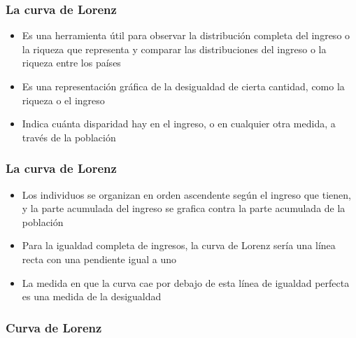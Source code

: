 \documentclass{beamer}
\begin{document}
\begin{frame} 
\frametitle{La curva de Lorenz}
\begin{itemize}
\item Es una herramienta útil para observar la distribución completa del ingreso o la riqueza que representa y comparar las distribuciones del ingreso o la riqueza entre los países
\item Es una representación gráfica de la desigualdad de cierta cantidad, como la riqueza o el ingreso
\item Indica cuánta disparidad hay en el ingreso, o en cualquier otra medida, a través de la población
\end{itemize}
\end{frame}

\begin{frame} 
\frametitle{La curva de Lorenz}
\begin{itemize}
\item Los individuos se organizan en orden ascendente según el ingreso que tienen, y la parte acumulada del ingreso se grafica contra la parte acumulada de la población
\item Para la igualdad completa de ingresos, la curva de Lorenz sería una línea recta con una pendiente igual a uno
\item La medida en que la curva cae por debajo de esta línea de igualdad perfecta es una medida de la desigualdad
\end{itemize}
\end{frame}

\begin{frame} 
\frametitle{Curva de Lorenz}
\begin{figure} [H]
\centering
{}
\end{figure} 
\end{frame}
\end{document}
